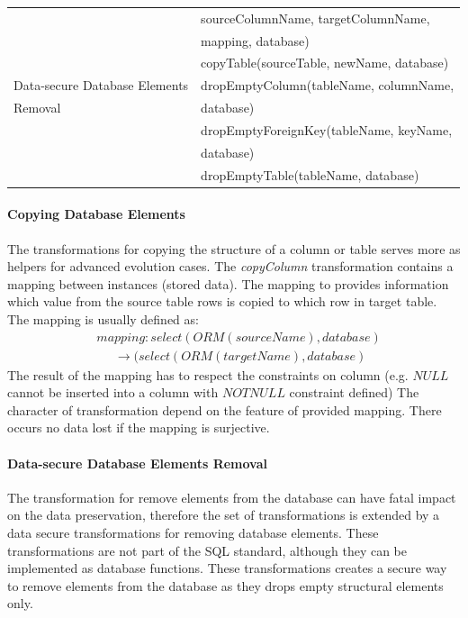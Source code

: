\documentclass[runningheads]{comsis}
\begin{document}
\begin{table}
\begin{tabular}{ll}
	& \hspace{0.5in} sourceColumnName, targetColumnName, \\ 
	& \hspace{0.5in} mapping, database) \\
	& copyTable(sourceTable, newName, database) \\
	Data-secure Database Elements &
	dropEmptyColumn(tableName, columnName, \\
	Removal & \hspace{0.25in} database) \\
	& dropEmptyForeignKey(tableName, keyName, \\ & \hspace{0.25in} database) \\
	& dropEmptyTable(tableName, database) \\
	\hline
	\end{tabular}
\end{table}


\paragraph{Copying Database Elements}The transformations for copying the structure of a column or table serves more as helpers for advanced evolution cases. The \emph{copyColumn} transformation contains a mapping between instances (stored data). The mapping to provides information which value from the source table rows is copied to which row in target table. The mapping is usually defined as: 
\begin{align}\label{eq:mapping}
&	mapping : select(ORM(sourceName), database) \nonumber \\ 
& \;\;\;\;\; \rightarrow  (select(ORM(targetName), database) 
\end{align}
The result of the mapping has to respect the constraints on column (e.g. $NULL$ cannot be inserted into a column with $NOTNULL$ constraint defined) The character of transformation depend on the feature of provided mapping. There occurs no data lost if the mapping is surjective.

\paragraph{Data-secure Database Elements Removal} The transformation for remove elements from the database can have fatal impact on the data preservation, therefore the set of transformations is extended by a data secure transformations for removing database elements. These transformations are not part of the SQL standard, although they can be implemented as database functions. These transformations creates a secure way to remove elements from the database as they drops empty structural elements only. 
\end{document}
